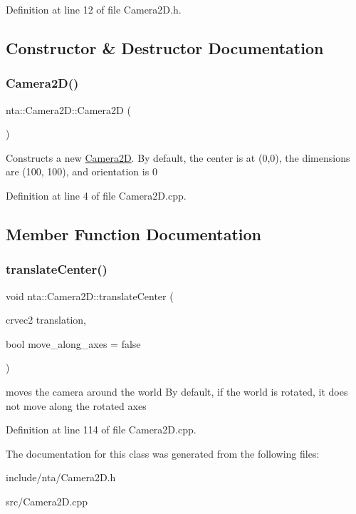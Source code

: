 Definition at line 12 of file Camera2\+D.\+h.



\subsection{Constructor \& Destructor Documentation}
\mbox{\label{classnta_1_1Camera2D_a11aada3f997c594ade11dd3c46d826f4}} 
\subsubsection{\texorpdfstring{Camera2\+D()}{Camera2D()}}
{\footnotesize\ttfamily nta\+::\+Camera2\+D\+::\+Camera2D (\begin{DoxyParamCaption}{ }\end{DoxyParamCaption})}

Constructs a new \hyperlink{classnta_1_1Camera2D}{Camera2D}. By default, the center is at (0,0), the dimensions are (100, 100), and orientation is 0 

Definition at line 4 of file Camera2\+D.\+cpp.



\subsection{Member Function Documentation}
\mbox{\label{classnta_1_1Camera2D_a711b1b64b4e0bbca5c598ac15609f498}} 
\subsubsection{\texorpdfstring{translate\+Center()}{translateCenter()}}
{\footnotesize\ttfamily void nta\+::\+Camera2\+D\+::translate\+Center (\begin{DoxyParamCaption}\item[{crvec2}]{translation,  }\item[{bool}]{move\+\_\+along\+\_\+axes = {\ttfamily false} }\end{DoxyParamCaption})}

moves the camera around the world By default, if the world is rotated, it does not move along the rotated axes 

Definition at line 114 of file Camera2\+D.\+cpp.



The documentation for this class was generated from the following files\+:\begin{DoxyCompactItemize}
\item 
include/nta/Camera2\+D.\+h\item 
src/Camera2\+D.\+cpp\end{DoxyCompactItemize}
